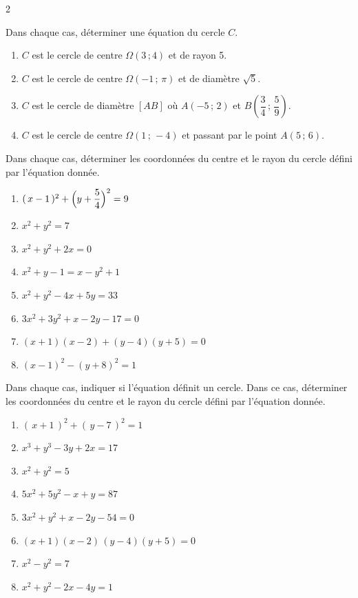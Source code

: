 \documentclass[a4paper,12pt]{article}
\begin{document}
\begin{multicols}{2}
\begin{exercice}[title=Exercice 6 $\star$ { [Calculer] }]{}{}
  Dans chaque cas, déterminer une équation du cercle $C$.
  \begin{enumerate}
    \item $C$ est le cercle de centre $\Omega(3\,;4)$ et de rayon 5.
    \item $C$ est le cercle de centre $\Omega(-1\,;\,\pi)$ et de diamètre $\sqrt{5}$.
    \item $C$ est le cercle de diamètre $[AB]$ où $A(-5\,;\,2)$ et $B\left(\dfrac{3}{4}\,;\,\dfrac{5}{9}\right)$.
    \item $C$ est le cercle de centre $\Omega(1\,;\,-4)$ et passant par le point $A(5\,;\,6)$.
  \end{enumerate}
\end{exercice}

\newcolumn

\begin{exercice}[title=Exercice 7 $\star$ { [Calculer] }]{}{}
  Dans chaque cas, déterminer les coordonnées du centre et le rayon du cercle défini par l'équation donnée.
  \begin{enumerate}
    \item $(\,x-1\,)^2 + \Bigl(y + \dfrac{5}{4}\Bigr)^2 = 9$
    \item $x^2 + y^2 = 7$
    \item $x^2 + y^2 + 2x = 0$
    \item $x^2 + y - 1 = x - y^2 + 1$
    \item $x^2 + y^2 - 4x + 5y = 33$
    \item $3x^2 + 3y^2 + x - 2y - 17 = 0$
    \item $(x + 1)(x - 2) + (y - 4)(y + 5) = 0$
    \item $(x - 1)^2 - (y + 8)^2 = 1$
  \end{enumerate}
\end{exercice}

\begin{exercice}[title=Exercice 8 $\star$ { [Calculer] }]{}{}
  Dans chaque cas, indiquer si l'équation définit un cercle. Dans ce cas, déterminer les coordonnées du centre et le rayon du cercle défini par l'équation donnée.
  \begin{enumerate}
    \item $(\,x + 1\,)^2 + (\,y - 7\,)^2 = 1$
    \item $x^3 + y^3 - 3y + 2x = 17$
    \item $x^2 + y^2 = 5$
    \item $5x^2 + 5y^2 - x + y = 87$
    \item $3x^2 + y^2 + x - 2y - 54 = 0$
    \item $(x + 1)(x - 2)\,(y - 4)(y + 5) = 0$
    \item $x^2 - y^2 = 7$
    \item $x^2 + y^2 - 2x - 4y = 1$
  \end{enumerate}
\end{exercice}


\end{multicols}
\end{document}
